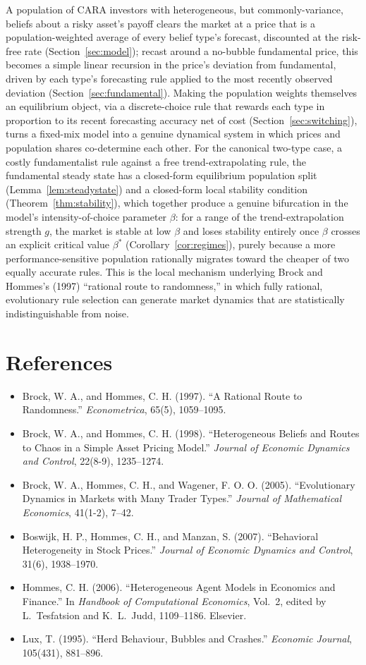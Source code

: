 \documentclass[11pt]{article}
\theoremstyle{remark}
\theoremstyle{definition}
\begin{document}
A population of CARA investors with heterogeneous, but commonly-variance, beliefs about a risky asset's payoff clears the market at a price that is a population-weighted average of every belief type's forecast, discounted at the risk-free rate (Section~\ref{sec:model}); recast around a no-bubble fundamental price, this becomes a simple linear recursion in the price's deviation from fundamental, driven by each type's forecasting rule applied to the most recently observed deviation (Section~\ref{sec:fundamental}). Making the population weights themselves an equilibrium object, via a discrete-choice rule that rewards each type in proportion to its recent forecasting accuracy net of cost (Section~\ref{sec:switching}), turns a fixed-mix model into a genuine dynamical system in which prices and population shares co-determine each other. For the canonical two-type case, a costly fundamentalist rule against a free trend-extrapolating rule, the fundamental steady state has a closed-form equilibrium population split (Lemma~\ref{lem:steadystate}) and a closed-form local stability condition (Theorem~\ref{thm:stability}), which together produce a genuine bifurcation in the model's intensity-of-choice parameter $\beta$: for a range of the trend-extrapolation strength $g$, the market is stable at low $\beta$ and loses stability entirely once $\beta$ crosses an explicit critical value $\beta^{*}$ (Corollary~\ref{cor:regimes}), purely because a more performance-sensitive population rationally migrates toward the cheaper of two equally accurate rules. This is the local mechanism underlying Brock and Hommes's (1997) ``rational route to randomness,'' in which fully rational, evolutionary rule selection can generate market dynamics that are statistically indistinguishable from noise.

\section*{References}
\begin{itemize}
\item Brock, W. A., and Hommes, C. H. (1997). ``A Rational Route to Randomness.'' \textit{Econometrica}, 65(5), 1059--1095.
\item Brock, W. A., and Hommes, C. H. (1998). ``Heterogeneous Beliefs and Routes to Chaos in a Simple Asset Pricing Model.'' \textit{Journal of Economic Dynamics and Control}, 22(8-9), 1235--1274.
\item Brock, W. A., Hommes, C. H., and Wagener, F. O. O. (2005). ``Evolutionary Dynamics in Markets with Many Trader Types.'' \textit{Journal of Mathematical Economics}, 41(1-2), 7--42.
\item Boswijk, H. P., Hommes, C. H., and Manzan, S. (2007). ``Behavioral Heterogeneity in Stock Prices.'' \textit{Journal of Economic Dynamics and Control}, 31(6), 1938--1970.
\item Hommes, C. H. (2006). ``Heterogeneous Agent Models in Economics and Finance.'' In \textit{Handbook of Computational Economics}, Vol.\ 2, edited by L.\ Tesfatsion and K.\ L.\ Judd, 1109--1186. Elsevier.
\item Lux, T. (1995). ``Herd Behaviour, Bubbles and Crashes.'' \textit{Economic Journal}, 105(431), 881--896.
\end{itemize}
\end{document}
